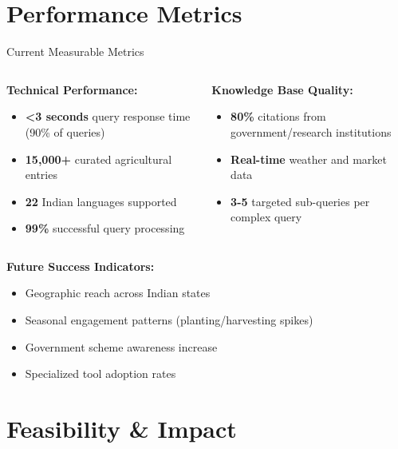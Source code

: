 \documentclass[aspectratio=169]{beamer}
\begin{document}
\section{Performance Metrics}

\begin{frame}{Current Measurable Metrics}
\begin{columns}
\begin{column}{0.5\textwidth}
\textbf{Technical Performance:}
\begin{itemize}
\item \textcolor{indicgreen}{\textbf{<3 seconds}} query response time (90\% of queries)
\item \textcolor{indicblue}{\textbf{15,000+}} curated agricultural entries
\item \textcolor{indicorange}{\textbf{22}} Indian languages supported
\item \textcolor{indicgreen}{\textbf{99\%}} successful query processing
\end{itemize}
\end{column}
\begin{column}{0.5\textwidth}
\textbf{Knowledge Base Quality:}
\begin{itemize}
\item \textcolor{indicgreen}{\textbf{80\%}} citations from government/research institutions
\item \textcolor{indicblue}{\textbf{Real-time}} weather and market data
\item \textcolor{indicorange}{\textbf{3-5}} targeted sub-queries per complex query
\end{itemize}
\end{column}
\end{columns}

\vspace{0.5cm}
\textbf{Future Success Indicators:}
\begin{itemize}
\item Geographic reach across Indian states
\item Seasonal engagement patterns (planting/harvesting spikes)
\item Government scheme awareness increase
\item Specialized tool adoption rates
\end{itemize}
\end{frame}

\section{Feasibility \& Impact}
\end{document}
